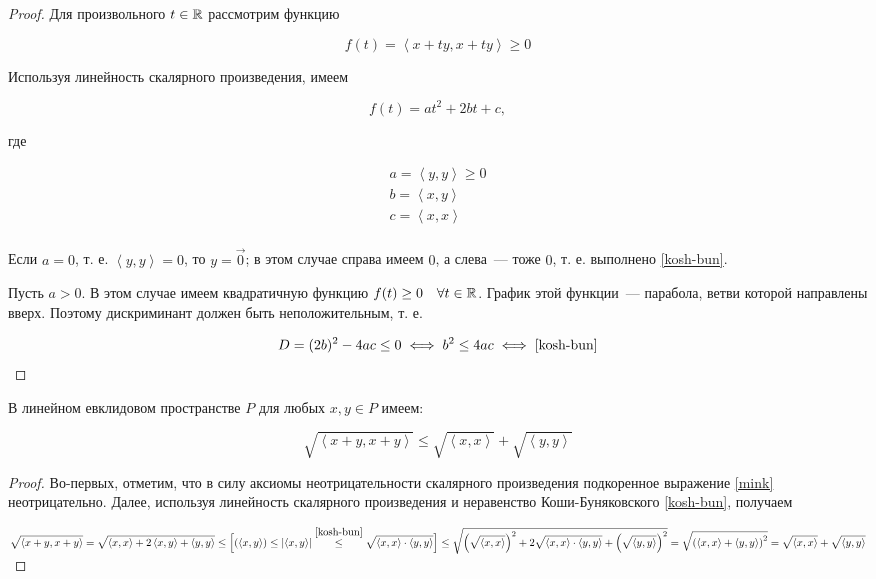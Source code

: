 \documentclass[../../main.tex]{subfiles}
\begin{document}
\begin{proof}
 Для произвольного $t \in \mathbb{R}$ рассмотрим функцию
 
 \[f(t) = \left<x + ty, x + ty\right> \ge 0\]

 Используя линейность скалярного произведения, имеем
 
 \[f(t) = at^2 + 2bt + c,\]
 
 где
 
 \[
   \begin{array}{c}
    a = \left<y, y\right> \ge 0 \\
    b = \left<x, y\right> \\
    c = \left<x, x\right> \\
   \end{array}
 \]
 
 Если $a = 0$, т. е. $\left<y, y\right> = 0$, то $y = \vec 0$; в этом 
 случае справа имеем $0$, а слева~--- тоже $0$, т. е. выполнено 
 \eqref{kosh-bun}.
 
 Пусть $a > 0$. В этом случае имеем квадратичную функцию $f(t) \ge 0 
 \quad \forall t \in \mathbb{R}$. График этой функции~--- парабола, ветви 
 которой направлены вверх. Поэтому дискриминант должен быть 
 неположительным, т. е.
 
 \[
   D = (2b)^2 - 4ac \le 0 \iff b^2 \le 4ac \iff \eqref{kosh-bun} 
   \qedhere
 \]

\end{proof}

\begin{crl*}
 В линейном евклидовом пространстве $P$ для любых $x, y \in P$ имеем:
 
 \begin{equation}
  \label{mink}
  \sqrt{\left<x+y, x+y\right>} \le
  \sqrt{\left<x, x\right>} + \sqrt{\left<y, y\right>}
 \end{equation}

\end{crl*}

\begin{proof}
 Во-первых, отметим, что в силу аксиомы неотрицательности скалярного 
 произведения подкоренное выражение \eqref{mink} неотрицательно. 
 Далее, используя линейность скалярного произведения и неравенство 
 Коши-Буняковского \eqref{kosh-bun}, получаем
 
 $\displaystyle
  \sqrt{\left<x+y, x+y\right>} = 
  \sqrt{\left<x, x\right> + 2\left<x, y\right> + \left<y, y\right>} 
  \le
  \Big[
    (\left<x, y\right>) \le \left|{\left<x, y\right>}\right|
    \stackrel{\eqref{kosh-bun}}{\le} \sqrt{\left<x, x\right> \cdot
    \left<y, y\right>}
  \Big]
  \le
  \sqrt{\left(\sqrt{\left<x, x\right>}\right)^2 +
        2\sqrt{\left<x, x\right> \cdot \left<y, y\right>} +
        \left(\sqrt{\left<y, y\right>}\right)^2} =
  \sqrt{\left(\left<x, x\right> + \left<y, y\right>\right)^2} =
  \sqrt{\left<x, x\right>} + \sqrt{\left<y, y\right>}
 $
\end{proof}
\end{document}
